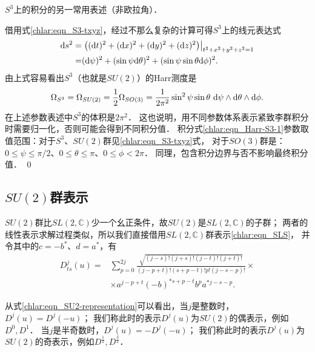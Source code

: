\begin{example}
	$S^3$上的积分的另一常用表述（非欧拉角）．
\end{example}

借用式\eqref{chlar:eqn_S3-txyz}，经过不那么复杂的计算可得$S^3$上的线元表达式
\begin{align*}
	{\rm d} s^2 =& \left.\left(({\rm d} t)^2 + ({\rm d} x)^2 + ({\rm d} y)^2 + ({\rm d} z)^2
	\right)\right|_{t^2+x^2+y^2+z^2=1}   \\
	=& ({\rm d} \psi)^2 + (\sin \psi {\rm d} \theta)^2  + (\sin\psi\sin\theta {\rm d} \phi)^2 .
\end{align*}
由上式容易看出$S^3$（也就是$SU(2)$）的Harr测度是
\begin{equation}\label{chlar:eqn_Harr-S3-1}
	\Omega_{S^3} =\Omega_{SU(2)} = \frac{1}{2}\Omega_{SO(3)}
	= \frac{1}{2\pi^2} \sin^2\psi \sin\theta \  {\rm d} \psi\wedge {\rm d} \theta \wedge  {\rm d} \phi .
\end{equation}
在上述参数表述中$S^3$的体积是$2\pi^2$．
这也说明，用不同参数体系表示紧致李群积分时需要归一化，否则可能会得到不同积分值．
积分式\eqref{chlar:eqn_Harr-S3-1}参数取值范围：对于$S^3$、$SU(2)$群见\eqref{chlar:eqn_S3-txyz}式，
对于$SO(3)$群是：$0 \leqslant \psi \leqslant \pi/2$、$ 0\leqslant \theta \leqslant \pi $、$0\leqslant \phi  < 2\pi$．
同理，包含积分边界与否不影响最终积分值．
\qed


\subsection{$SU(2)$群表示}

$SU(2)$群比$SL(2,\mathbb{C})$少一个幺正条件，故$SU(2)$是$SL(2,\mathbb{C})$的子群；
两者的线性表示求解过程类似，所以我们直接借用$SL(2,\mathbb{C})$群表示\eqref{chlar:eqn_SLS}，
并令其中的$c=-b^*$、$d=a^*$，有
\begin{equation}\label{chlar:eqn_SU2-representation}
    \begin{aligned}
        D^{j}_{ts}(u) =&  \sum_{p=0}^{2j} 
        \frac{\sqrt{(j-s)! (j+s)! (j-t)! (j+t)!}  }
        { (j-p+t)! (s+p-t)! p!(j-s-p)! }\times \\
        & \times a^{j-p+t} (-b)^{*s+p-t} b^{p} a^{*j-s-p} .
    \end{aligned}
\end{equation} %


从式\eqref{chlar:eqn_SU2-representation}可以看出，当$j$是整数时，$D^j(u)=D^j(-u)$；
我们称此时的表示$D^j(u)$为$SU(2)$的{\heiti 偶表示}，例如$D^0, D^1$．
当$j$是半奇数时，$D^j(u)=-D^j(-u)$；
我们称此时的表示$D^j(u)$为$SU(2)$的{\heiti 奇表示}，例如$D^{\frac{1}{2}}, D^{\frac{3}{2}}$．

